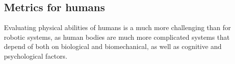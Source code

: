 
\subsection{Metrics for humans}

Evaluating physical abilities of humans is a much more challenging than for robotic systems, as human bodies are much more complicated systems that depend of both on biological and biomechanical, as well as cognitive and psychological factors.

